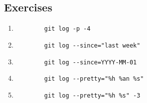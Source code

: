 \subsection{Exercises}
\begin{enumerate}
    \item
        \begin{verbatim}
        git log -p -4
        \end{verbatim}
    \item
        \begin{verbatim}
        git log --since="last week"
        \end{verbatim}
    \item
        \begin{verbatim}
        git log --since=YYYY-MM-01
        \end{verbatim}
    \item
        \begin{verbatim}
        git log --pretty="%h %an %s"
        \end{verbatim}
    \item
        \begin{verbatim}
        git log --pretty="%h %s" -3
        \end{verbatim}
\end{enumerate}
